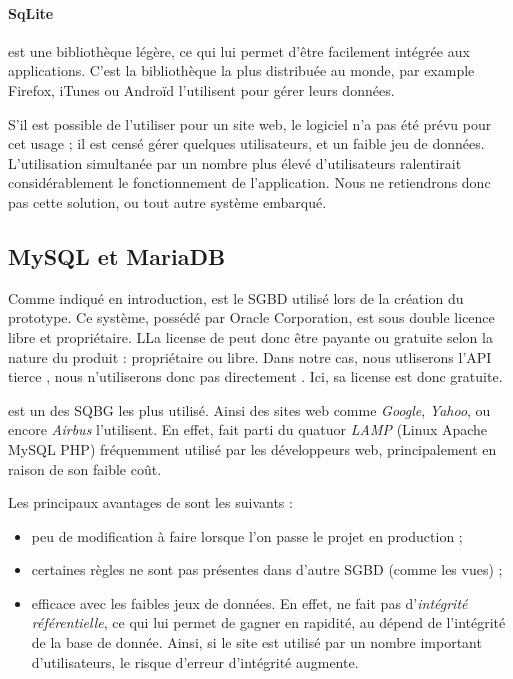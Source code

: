 \paragraph*{SqLite} est une bibliothèque légère, ce qui lui permet d'être facilement intégrée aux applications. C'est la bibliothèque la plus distribuée au monde, par example Firefox, iTunes ou Androïd l'utilisent pour gérer leurs données. 


S'il est possible de l'utiliser pour un site web, le logiciel n'a pas été prévu pour cet usage ; il est censé gérer quelques utilisateurs, et un faible jeu  de données. L'utilisation simultanée par un nombre plus élevé d'utilisateurs ralentirait considérablement le fonctionnement de l'application. Nous ne retiendrons donc pas cette solution, ou  tout autre système embarqué. 

\subsection{MySQL et MariaDB}
 
 Comme indiqué en introduction, \mysql est le SGBD utilisé lors de la création du prototype. Ce système, possédé par Oracle Corporation, est sous double licence libre et propriétaire. LLa license de \mysql peut donc être payante ou gratuite selon la nature du produit : propriétaire ou libre. Dans notre cas, nous utliserons l'API tierce \symfony, nous n'utiliserons donc pas directement \mysql. Ici, sa license est donc gratuite. 
 
 \mysql est un des SQBG les plus utilisé. Ainsi des sites web comme \textit{Google}, \textit{Yahoo}, ou encore \textit{Airbus}	l'utilisent. En effet, \mysql fait parti du quatuor \textit{LAMP} (Linux Apache MySQL PHP) fréquemment utilisé par les développeurs web, principalement en raison de son faible coût. 
 
 \smallbreak
 
 Les principaux avantages de \mysql sont les suivants : 
 \begin{itemize}
 \item peu de modification à faire lorsque l'on passe le projet en production  ;
 \item certaines règles ne sont pas présentes dans d'autre SGBD (comme les vues) ;
 \item efficace avec les faibles jeux de données. En effet, \mysql ne fait pas d'\textit{intégrité référentielle}, ce qui lui permet de gagner en rapidité, au dépend de l'intégrité de la base de donnée. Ainsi, si le site est utilisé par un nombre important d'utilisateurs, le risque d'erreur d'intégrité augmente. 
 \end{itemize}

